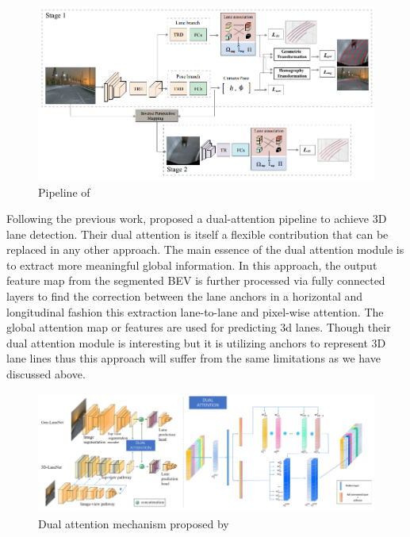  \begin{figure}[h]
    \centering
    \includegraphics[width=\textwidth]{images/3dLane_camera_pose_pipeline.png}
    \caption{Pipeline of \cite{DBLP:journals/corr/abs-2112-15351}}
    \end{figure}

Following the previous work, \cite{9506296} proposed a dual-attention pipeline to achieve 3D lane detection. Their dual attention is itself a flexible contribution that can be replaced in any other approach. The main essence of the dual attention module is to extract more meaningful global information. In this approach, the output feature map from the segmented BEV is further processed via fully connected layers to find the correction between the lane anchors in a horizontal and longitudinal fashion this extraction lane-to-lane and pixel-wise attention. The global attention map or features are used for predicting 3d lanes. Though their dual attention module is interesting but it is utilizing anchors to represent 3D lane lines thus this approach will suffer from the same limitations as we have discussed above. 

 \begin{figure}[h]
    \centering
\includegraphics[width=12cm, height=4cm]{images/dual_attention_pipeline.png}
    \caption{Dual attention mechanism  proposed by  \cite{9506296}}
    \end{figure}


